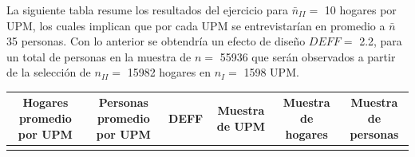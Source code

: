 \documentclass[12pt,spanish,]{book}
\begin{document}
La siguiente tabla resume los resultados del ejercicio para \(\bar{n}_{II} =\) 10 hogares por UPM, los cuales implican que por cada UPM se entrevistarían en promedio a \(\bar{n}\) 35 personas. Con lo anterior se obtendría un efecto de diseño \(DEFF =\) 2.2, para un total de personas en la muestra de \(n =\) 55936 que serán observados a partir de la selección de \(n_{II} =\) 15982 hogares en \(n_{I} =\) 1598 UPM.

\begin{longtable}[]{@{}cccccc@{}}
\toprule
\begin{minipage}[b]{0.16\columnwidth}\centering
Hogares promedio por UPM\strut
\end{minipage} & \begin{minipage}[b]{0.19\columnwidth}\centering
Personas promedio por UPM\strut
\end{minipage} & \begin{minipage}[b]{0.09\columnwidth}\centering
DEFF\strut
\end{minipage} & \begin{minipage}[b]{0.13\columnwidth}\centering
Muestra de UPM\strut
\end{minipage} & \begin{minipage}[b]{0.13\columnwidth}\centering
Muestra de hogares\strut
\end{minipage} & \begin{minipage}[b]{0.13\columnwidth}\centering
Muestra de personas\strut
\end{minipage}\tabularnewline
\midrule
\endhead
\begin{minipage}[t]{0.16\columnwidth}\centering
10\strut
\end{minipage} & \begin{minipage}[t]{0.19\columnwidth}\centering
35\strut
\end{minipage} & \begin{minipage}[t]{0.09\columnwidth}\centering
2.2\strut
\end{minipage} & \begin{minipage}[t]{0.13\columnwidth}\centering
1598\strut
\end{minipage} & \begin{minipage}[t]{0.13\columnwidth}\centering
15982\strut
\end{minipage} & \begin{minipage}[t]{0.13\columnwidth}\centering
55936\strut
\end{minipage}\tabularnewline
\bottomrule
\end{longtable}
\end{document}
